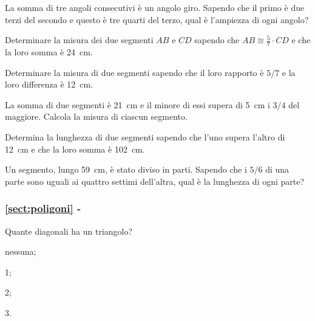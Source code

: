 \begin{multicols}{2}
\begin{esercizio}
\label{ese:1.119}
La somma di tre angoli consecutivi è un angolo giro. Sapendo che il 
primo è due terzi del secondo e questo è tre quarti del terzo, qual è 
l'ampiezza di ogni angolo?
\end{esercizio}

\begin{esercizio}
\label{ese:1.120}
Determinare la misura dei due segmenti $AB$ e $CD$ sapendo che 
$AB\cong \frac{5}{7}\cdot CD$ e che la loro somma è 24~cm.
\end{esercizio}

\begin{esercizio}
\label{ese:1.121}
Determinare la misura di due segmenti sapendo che il loro rapporto è 
$5/7$ e la loro differenza è 12~cm.
\end{esercizio}

\begin{esercizio}
\label{ese:1.122}
La somma di due segmenti è 21~cm e il minore di essi supera di 5~cm i 
$3/4$ del maggiore. Calcola la misura di ciascun segmento.
\end{esercizio}

\begin{esercizio}
\label{ese:1.123}
Determina la lunghezza di due segmenti sapendo che l'uno supera 
l'altro di 12~cm e che la loro somma è 102~cm.
\end{esercizio}

\begin{esercizio}
\label{ese:1.124}
Un segmento, lungo 59~cm, è stato diviso in parti. Sapendo che i 
$5/6$ di una parte sono uguali ai quattro settimi dell'altra, qual è 
la lunghezza di ogni parte?
\end{esercizio}

\end{multicols}

\begingroup
\hypersetup{linkcolor=black}
\subsubsection*{\ref{sect:poligoni} - }
\endgroup

\begin{esercizio}
\label{ese:1.125}
Quante diagonali ha un triangolo?
\begin{multicols}{4}
\begin{enumeratea}
\item nessuna;
\item 1;
\item 2;
\item 3.
\end{enumeratea}
\end{multicols}
\end{esercizio}

